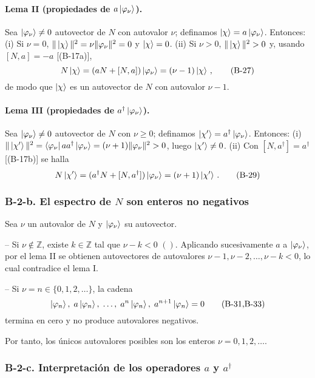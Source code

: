 \documentclass[a4paper,11pt]{article}
\begin{document}
\paragraph{Lema II (propiedades de \(a\ket{\varphi_\nu}\)).}  
Sea \(\ket{\varphi_\nu}\ne0\) autovector de \(N\) con autovalor \(\nu\); definamos  
\(\ket{\chi}=a\ket{\varphi_\nu}\). Entonces:  
(i) Si \(\nu=0\), \(\|\ket{\chi}\|^2=\nu\|\varphi_\nu\|^2=0\) y \(\ket{\chi}=0\).  
(ii) Si \(\nu>0\), \(\|\ket{\chi}\|^2>0\) y, usando \([N,a]=-a\) [(B-17a)],
\[
N\ket{\chi}=(aN+[N,a])\ket{\varphi_\nu}
=(\nu-1)\ket{\chi}\,,
\tag{B-27}
\]
de modo que \(\ket{\chi}\) es un autovector de \(N\) con autovalor \(\nu-1\).

\paragraph{Lema III (propiedades de \(a^\dagger\ket{\varphi_\nu}\)).}  
Sea \(\ket{\varphi_\nu}\ne0\) autovector de \(N\) con \(\nu\ge0\); definamos  
\(\ket{\chi'}=a^\dagger\ket{\varphi_\nu}\). Entonces:  
(i) \(\|\ket{\chi'}\|^2=\bra{\varphi_\nu}aa^\dagger\ket{\varphi_\nu}
=(\nu+1)\|\varphi_\nu\|^2>0\), luego \(\ket{\chi'}\ne0\).  
(ii) Con \([N,a^\dagger]=a^\dagger\) [(B-17b)] se halla
\[
N\ket{\chi'}
=(a^\dagger N+[N,a^\dagger])\ket{\varphi_\nu}
=(\nu+1)\ket{\chi'}\,.
\tag{B-29}
\]

\subsubsection*{B-2-b. El espectro de \(N\) son enteros no negativos}

Sea \(\nu\) un autovalor de \(N\) y \(\ket{\varphi_\nu}\) su autovector.  

– Si \(\nu\notin\mathbb{Z}\), existe \(k\in\mathbb{Z}\) tal que  
\(\nu-k<0\)  \((\!)\).  
Aplicando sucesivamente \(a\) a \(\ket{\varphi_\nu}\), por el lema II se obtienen autovectores de autovalores \(\nu-1,\nu-2,\dots,\nu-k<0\), lo cual contradice el lema I.  

– Si \(\nu=n\in\{0,1,2,\dots\}\), la cadena  
\[
\ket{\varphi_n},\;a\ket{\varphi_n},\;\dots,\;a^n\ket{\varphi_n},\;
a^{n+1}\ket{\varphi_n}=0
\tag{B-31,B-33}
\]
termina en cero y no produce autovalores negativos.  

Por tanto, los únicos autovalores posibles son los enteros \(\nu=0,1,2,\dots\).

\subsubsection*{B-2-c. Interpretación de los operadores \(a\) y \(a^\dagger\)}
\end{document}
